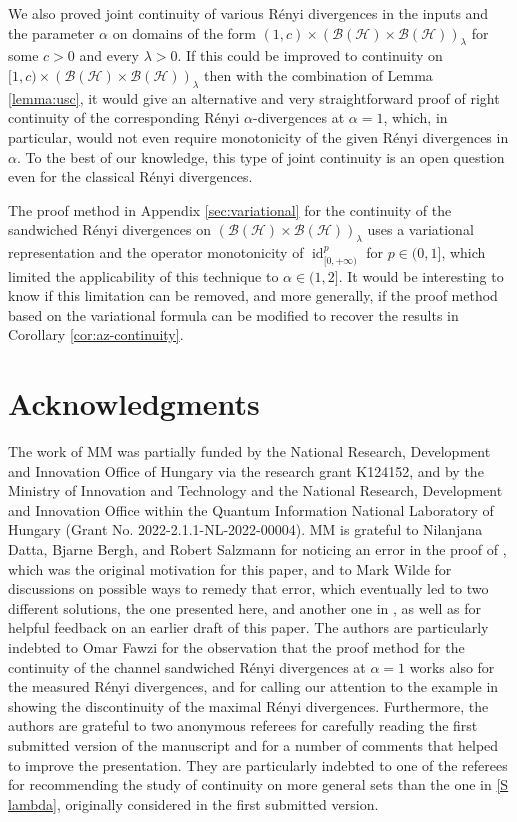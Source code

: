 \documentclass[unsortedaddress,superscriptaddress,pra,notitlepage]{revtex4}
\def\B{{\mathcal B}}
\def\hil{{\mathcal H}}
\def\cpso{\text{CPSO} }
\DeclareMathOperator{\id}{id}
\begin{document}
We also proved joint continuity of various R\'enyi divergences in the inputs and the
parameter $\alpha$ on domains of the form $(1,c)\times(\B(\hil)\times\B(\hil))_{\lambda}$
for some $c>0$ and every $\lambda>0$. If this could be improved to continuity on 
$[1,c)\times(\B(\hil)\times\B(\hil))_{\lambda}$ then with the combination of Lemma \ref{lemma:usc},
it would give an alternative and very straightforward proof of right continuity of the corresponding 
\cpso R\'enyi $\alpha$-divergences at $\alpha=1$, which, in particular, would not even require monotonicity 
of the given R\'enyi divergences in $\alpha$.
To the best of our knowledge, this 
type of joint continuity is an open question 
even for the classical R\'enyi divergences.

The proof method in Appendix \ref{sec:variational} 
for the continuity of the sandwiched R\'enyi divergences on 
$(\B(\hil)\times\B(\hil))_{\lambda}$ uses a variational representation and the 
operator monotonicity of $\id_{[0,+\infty)}^{p}$ for $p\in(0,1]$,
which limited the applicability of this technique to $\alpha\in(1,2]$. It would be 
interesting to know if this limitation can be removed, and more generally,
if the proof method based on the variational formula can be modified 
to recover the results in Corollary \ref{cor:az-continuity}.


\section*{Acknowledgments}

The work of MM was partially funded by the
National Research, Development and 
Innovation Office of Hungary via the research grant K124152, and
by the Ministry of Innovation and
Technology and the National Research, Development and Innovation
Office within the Quantum Information National Laboratory of Hungary
(Grant No. 2022-2.1.1-NL-2022-00004).
MM is grateful to 
Nilanjana Datta, Bjarne Bergh, and Robert Salzmann for noticing an error in the proof of 
\cite[Lemma 10]{CMW}, which was the original motivation for this paper,
and to Mark Wilde for discussions on possible ways to remedy that error, which eventually led to 
two different solutions, the one presented here, and another one in \cite[Appendix B]{Dingetal2020}, as well as for helpful feedback on an earlier draft of this paper.
The authors are particularly indebted to  
Omar Fawzi for the observation that the proof method for the continuity of the channel sandwiched
R\'enyi divergences at $\alpha=1$ works also for the measured R\'enyi divergences,
and for calling our attention to the example in \cite{FF2020}
showing the discontinuity of 
the maximal R\'enyi divergences.
Furthermore, the authors are grateful to two anonymous referees for carefully reading 
the first submitted version of the manuscript and for a number of comments that helped to 
improve the presentation. They are particularly indebted to one of the referees for 
recommending the study of continuity on more general sets than the one in \eqref{S lambda}, 
originally considered in the first submitted version.
\end{document}
